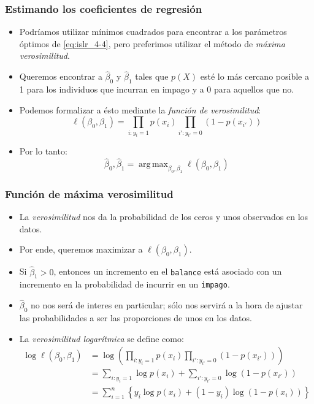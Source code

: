 \documentclass[usenames,dvipsnames]{beamer} %
\DeclareMathOperator*{\argmax}{arg\,max}
\newcommand\vari[1]{\textcolor{BrickRed}{\texttt{#1}}}
\newcommand\defi[1]{\textcolor{NavyBlue}{\textit{#1}}}
\begin{document}
\begin{frame}\frametitle{Estimando los coeficientes de regresi\'on}
\begin{itemize}
	\item Podr\'iamos utilizar m\'inimos cuadrados para encontrar a los par\'ametros \'optimos de \ref{eq:islr_4-4}, pero preferimos utilizar el m\'etodo de \defi{m\'axima verosimilitud}.
	\item Queremos encontrar a $\hat \beta_0$ y $\hat \beta_1$ tales que $p(X)$ est\'e lo m\'as cercano posible a 1 para los individuos que incurran en impago y a 0 para aquellos que no.
	\item Podemos formalizar a \'esto mediante la \defi{funci\'on de verosimilitud}:
	\begin{equation}\label{eq:islr_4-5}
	\ell(\beta_0, \beta_1)=\prod_{i:y_i=1}p(x_i)\prod_{i':y_{i'}=0}(1-p(x_{i'}))
	\end{equation}
	\item Por lo tanto:
	\begin{equation}\label{eq:islr_4-5a}
	\hat \beta_0, \hat \beta_1 = \argmax_{\beta_0, \beta_1} \ell (\beta_0, \beta_1)
	\end{equation}
\end{itemize}
\end{frame}

\begin{frame}\frametitle{Funci\'on de m\'axima verosimilitud}
\begin{itemize}
	\item La \defi{verosimilitud} nos da la probabilidad de los ceros y unos observados en los datos.
	\item Por ende, queremos maximizar a $\ell (\beta_0, \beta_1)$.
	\item Si $\hat \beta_1>0$, entonces un incremento en el \vari{balance} est\'a asociado con un incremento en la probabilidad de incurrir en un \vari{impago}.
	\item $\hat \beta_0$ no nos ser\'a de interes en particular; s\'olo nos servir\'a a la hora de ajustar las probabilidades a ser las proporciones de unos en los datos.
	\item La \defi{verosimilitud logar\'itmica} se define como:
	\begin{align*} \log{\ell(\beta_0, \beta_1)}&= \log{\left( \prod_{i:y_i=1}p(x_i)\prod_{i':y_{i'}=0}(1-p(x_{i'}))\right)}\\
	&=\sum_{i:y_i=1}\log{p(x_i)} + \sum_{i':y_{i'}=0}\log{(1-p(x_{i'}))}\\
	&=\sum_{i=1}^n \left\{ y_i \log{p(x_i)} + (1-y_i)\log{(1-p(x_{i}))} \right\}
	\end{align*}
\end{itemize}
\end{frame}
\end{document}
